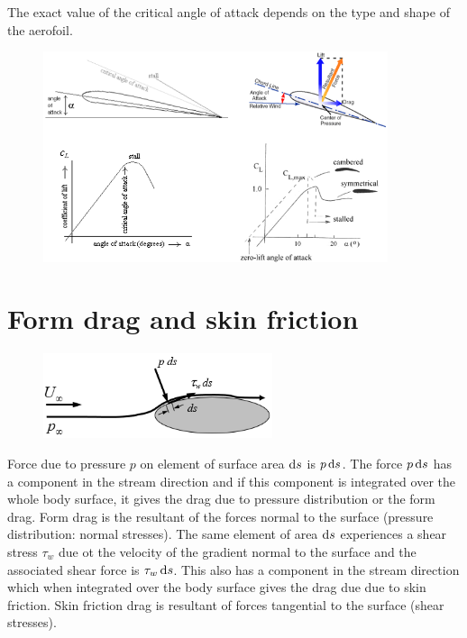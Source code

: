 \documentclass[class=report, crop=false, 12pt,a4paper]{standalone}
\begin{document}
The exact value of the critical angle of attack depends on the type and shape of the aerofoil.
\begin{figure}[H]
  \centering
  \includegraphics[width = 0.9\textwidth]{../img/diagram43.png}
\end{figure}
\section{Form drag and skin friction}
\begin{figure}[H]
  \centering
  \includegraphics[width = 0.6\textwidth]{../img/diagram45.png}
\end{figure}
Force due to pressure $p$ on element of surface area $\dif s$ is $p \dif s$. The force $p \dif s$ has a component in the stream direction and if this component is integrated over the whole body surface, it gives the drag due to pressure distribution or the form drag. Form drag is the resultant of the forces normal to the surface (pressure distribution: normal stresses). The same element of area $\dif s$ experiences a shear stress $\tau_w$ due ot the velocity of the gradient normal to the surface and the associated shear force is $\tau_w \dif s$. This also has a component in the stream direction which when integrated over the body surface gives the drag due due to skin friction. Skin friction drag is resultant of forces tangential to the surface (shear stresses).
\end{document}
